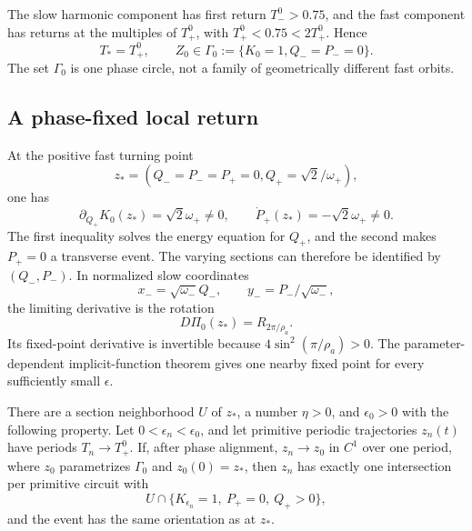 The slow harmonic component has first return \(T_-^0>0.75\), and the fast
component has returns at the multiples of \(T_+^0\), with
\(T_+^0<0.75<2T_+^0\).  Hence
\begin{equation}
 T_*=T_+^0,
 \qquad
 Z_0\in\Gamma_0:=\{K_0=1,Q_-=P_-=0\}.
 \label{eq:limiting-fast-circle}
\end{equation}
The set \(\Gamma_0\) is one phase circle, not a family of geometrically
different fast orbits.

\subsection{A phase-fixed local return}

At the positive fast turning point
\begin{equation}
 z_*=(Q_-=P_-=P_+=0, Q_+=\sqrt2/\omega_+),
 \label{eq:fast-turning-point}
\end{equation}
one has
\begin{equation}
 \partial_{Q_+}K_0(z_*)=\sqrt2\omega_+\ne0,
 \qquad
 \dot P_+(z_*)=-\sqrt2\omega_+\ne0.
 \label{eq:turning-transversality}
\end{equation}
The first inequality solves the energy equation for \(Q_+\), and the second
makes \(P_+=0\) a transverse event.  The varying sections can therefore be
identified by \((Q_-,P_-)\).  In normalized slow coordinates
\begin{equation}
 x_-=\sqrt{\omega_-}Q_-,
 \qquad y_-=P_-/\sqrt{\omega_-},
 \label{eq:normalized-slow}
\end{equation}
the limiting derivative is the rotation
\begin{equation}
 D\Pi_0(z_*)=R_{2\pi/\rho_a}.
 \label{eq:limiting-return-rotation}
\end{equation}
Its fixed-point derivative is invertible because
\(4\sin^2(\pi/\rho_a)>0\).  The parameter-dependent implicit-function
theorem gives one nearby fixed point for every sufficiently small
\(\epsilon\).

\begin{lemma}
\label{lem:unique-local-crossing}
There are a section neighborhood \(U\) of \(z_*\), a number \(\eta>0\),
and \(\epsilon_0>0\) with the following property.  Let
\(0<\epsilon_n<\epsilon_0\), and let primitive periodic trajectories
\(z_n(t)\) have periods \(T_n\to T_+^0\).  If, after phase alignment,
\(z_n\to z_0\) in \(C^1\) over one period, where \(z_0\) parametrizes
\(\Gamma_0\) and \(z_0(0)=z_*\), then \(z_n\) has exactly one intersection
per primitive circuit with
\[
 U\cap\{K_{\epsilon_n}=1,\ P_+=0,\ Q_+>0\},
\]
and the event has the same orientation as at \(z_*\).
\end{lemma}

